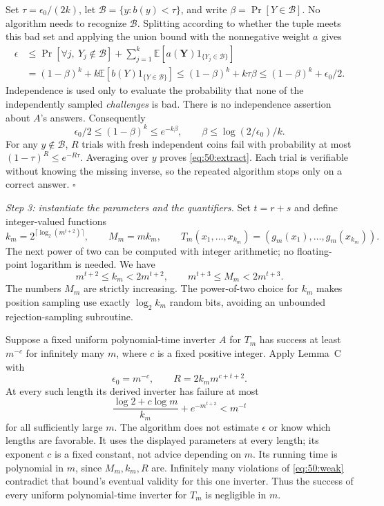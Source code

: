 \documentclass[11pt,a4paper]{article}
\newcommand{\E}{\mathbb{E}}
\numberwithin{equation}{section}
\begin{document}
Set $\tau=\epsilon_0/(2k)$, let
$\mathcal B=\{y:b(y)<\tau\}$, and write
$\beta=\Pr[Y\in\mathcal B]$. No algorithm needs to recognize
$\mathcal B$. Splitting according to whether the tuple meets this bad
set and applying the union bound with the nonnegative weight $a$ gives
\begin{align}
 \epsilon
 &\le \Pr[\forall j,\ Y_j\notin\mathcal B]
       +\sum_{j=1}^k \E[a(\mathbf Y)1_{\{Y_j\in\mathcal B\}}]
       \label{eq:50:bad1}\\
 &= (1-\beta)^k+k\E[b(Y)1_{\{Y\in\mathcal B\}}]
 \le (1-\beta)^k+k\tau\beta
 \le (1-\beta)^k+\epsilon_0/2. \label{eq:50:bad2}
\end{align}
Independence is used only to evaluate the probability
that none of the independently sampled \emph{challenges} is bad.
There is no independence assertion about $A$'s answers.
Consequently
\[
 \epsilon_0/2\le(1-\beta)^k\le e^{-k\beta},
 \qquad \beta\le\log(2/\epsilon_0)/k.
\]
For any $y\notin\mathcal B$, $R$ trials with fresh independent coins
fail with probability at most
$(1-\tau)^R\le e^{-R\tau}$. Averaging over $y$ proves
\eqref{eq:50:extract}. Each trial is verifiable without knowing the
missing inverse, so the repeated algorithm stops only on a correct
answer. \hfill$\square$

\textit{Step 3: instantiate the parameters and the quantifiers.}
Set $t=r+s$ and define integer-valued functions
\begin{equation}\label{eq:50:lengths}
 k_m=2^{\lceil\log_2(m^{t+2})\rceil},\qquad
 M_m=m k_m,\qquad
 T_m(x_1,\ldots,x_{k_m})=(g_m(x_1),\ldots,g_m(x_{k_m})).
\end{equation}
The next power of two can be computed with integer arithmetic; no
floating-point logarithm is needed. We have
\[
 m^{t+2}\le k_m<2m^{t+2},\qquad
 m^{t+3}\le M_m<2m^{t+3}.
\]
The numbers $M_m$ are strictly increasing. The power-of-two choice for
$k_m$ makes position sampling use exactly $\log_2 k_m$ random bits,
avoiding an unbounded rejection-sampling subroutine.

Suppose a fixed uniform polynomial-time inverter $A$ for $T_m$ has
success at least $m^{-c}$ for infinitely many $m$, where $c$ is a fixed
positive integer. Apply Lemma~C with
\[
 \epsilon_0=m^{-c},\qquad R=2k_m m^{c+t+2}.
\]
At every such length its derived inverter has failure at most
\begin{equation}\label{eq:50:contradiction}
 \frac{\log 2+c\log m}{k_m}+e^{-m^{t+2}}
       < m^{-t}
\end{equation}
for all sufficiently large $m$. The algorithm does not estimate
$\epsilon$ or know which lengths are favorable. It uses the displayed
parameters at every length; its exponent $c$ is a fixed constant, not
advice depending on $m$. Its running time is polynomial in $m$, since
$M_m,k_m,R$ are. Infinitely many violations of \eqref{eq:50:weak}
contradict that bound's eventual validity for this one inverter.
Thus the success of every uniform polynomial-time inverter for $T_m$
is negligible in $m$.
\end{document}
